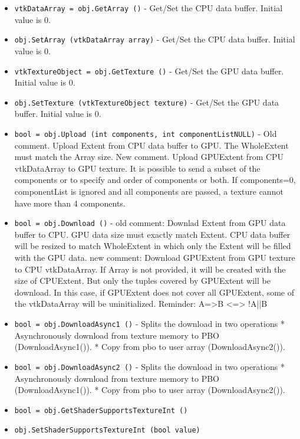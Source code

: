 \begin{itemize}
\item  \verb|vtkDataArray = obj.GetArray ()| -  Get/Set the CPU data buffer. Initial value is 0.

\item  \verb|obj.SetArray (vtkDataArray array)| -  Get/Set the CPU data buffer. Initial value is 0.

\item  \verb|vtkTextureObject = obj.GetTexture ()| -  Get/Set the GPU data buffer. Initial value is 0.

\item  \verb|obj.SetTexture (vtkTextureObject texture)| -  Get/Set the GPU data buffer. Initial value is 0.

\item  \verb|bool = obj.Upload (int components, int componentListNULL)| -  Old comment.
 Upload Extent from CPU data buffer to GPU.
 The WholeExtent must match the Array size.
 New comment.
 Upload GPUExtent from CPU vtkDataArray to GPU texture.
 It is possible to send a subset of the components or to specify and
 order of components or both. If components=0, componentList is ignored
 and all components are passed, a texture cannot have more than 4
 components.
 
 
 
 
 
 
 
 
 

\item  \verb|bool = obj.Download ()| -  old comment:
 Downlad Extent from GPU data buffer to CPU.
 GPU data size must exactly match Extent.
 CPU data buffer will be resized to match WholeExtent in which only the
 Extent will be filled with the GPU data.
 new comment:
 Download GPUExtent from GPU texture to CPU vtkDataArray.
 If Array is not provided, it will be created with the size of CPUExtent.
 But only the tuples covered by GPUExtent will be download. In this case,
 if GPUExtent does not cover all GPUExtent, some of the vtkDataArray will
 be uninitialized.
 Reminder: A=>B <=> !A||B
 
 
 
 
 
 
 
 
 

\item  \verb|bool = obj.DownloadAsync1 ()| -  Splits the download in two operations
 * Asynchronously download from texture memory to PBO (DownloadAsync1()).
 * Copy from pbo to user array (DownloadAsync2()).

\item  \verb|bool = obj.DownloadAsync2 ()| -  Splits the download in two operations
 * Asynchronously download from texture memory to PBO (DownloadAsync1()).
 * Copy from pbo to user array (DownloadAsync2()).

\item  \verb|bool = obj.GetShaderSupportsTextureInt ()|

\item  \verb|obj.SetShaderSupportsTextureInt (bool value)|

\end{itemize}
